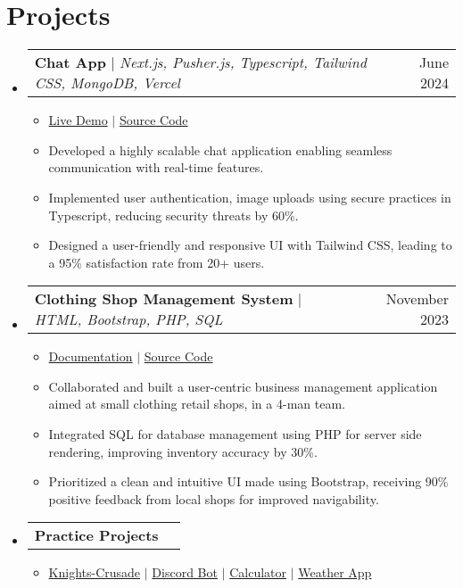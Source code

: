 \documentclass[letterpaper,11pt]{article}
\makeatletter
\newcommand{\resumeItem}[1]{
  \item\small{
    {#1 \vspace{-4pt}}
  }
}
\newcommand{\resumeProjectHeading}[2]{
    \item
    \begin{tabular*}{0.97\textwidth}{l@{\extracolsep{\fill}}r}
      \small#1 & #2 \\
    \end{tabular*}\vspace{-9pt}
}
\newcommand{\resumeSubHeadingListStart}{\begin{itemize}[leftmargin=0.15in, label={}]}
\newcommand{\resumeSubHeadingListEnd}{\end{itemize}}
\newcommand{\resumeItemListStart}{\begin{itemize}[leftmargin=0.15in]}
\newcommand{\resumeItemListEnd}{\end{itemize}\vspace{-6pt}}
\makeatother
\begin{document}
\section{Projects}
   \resumeSubHeadingListStart
     \resumeProjectHeading
         {\textbf{Chat App} $|$ \emph{Next.js, Pusher.js, Typescript, Tailwind CSS, MongoDB, Vercel}}{June 2024}
         \begin{itemize}[leftmargin=0.1in, label={}]
             \item \small{\href{https://chat-app-swart-psi.vercel.app/} {Live Demo} $|$ \href{https://github.com/JaiSwarup/chat-app} {Source Code}}\vspace{-10pt}
         \end{itemize} 
         \resumeItemListStart
           \resumeItem{Developed a highly scalable chat application enabling seamless communication with real-time features.}
           \resumeItem{Implemented user authentication, image uploads using secure practices in Typescript, reducing security threats by 60\%.}
           \resumeItem{Designed a user-friendly and responsive UI with Tailwind CSS, leading to a 95\% satisfaction rate from 20+ users.}
         \resumeItemListEnd
     \resumeProjectHeading
         {\textbf{Clothing Shop Management System} $|$ \emph{HTML, Bootstrap, PHP, SQL}}{November 2023}
         \begin{itemize}[leftmargin=0.1in, label={}]
             \item \small{\href{https://docs.google.com/document/d/1wQDYjDQLSN3Hz9uZrx8XHW-HuwrWJalbk5Lox-Q0Dnc/edit?usp=sharing} {Documentation} $|$ \href{https://github.com/JaiSwarup/crs.github.io} {Source Code}}\vspace{-10pt}
         \end{itemize} 
         \resumeItemListStart
           \resumeItem{Collaborated and built a user-centric business management application aimed at small clothing retail shops, in a 4-man team.}
           \resumeItem{Integrated SQL for database management using PHP for server side rendering, improving inventory accuracy by 30\%.}
           \resumeItem{Prioritized a clean and intuitive UI made using Bootstrap, receiving 90\% positive feedback from local shops for improved navigability.}
         \resumeItemListEnd
     \resumeProjectHeading
         {\textbf{Practice Projects}}{}
         \begin{itemize}[leftmargin=0.1in, label={}]
             \item \small \href{https://github.com/JaiSwarup/knights-crusade} {Knights-Crusade} $|$ \href{https://github.com/JaiSwarup/MemeBot} {Discord Bot} $|$ \href{https://github.com/JaiSwarup/calculatorapp.github.io} {Calculator} $|$ \href{https://github.com/JaiSwarup/weatherapp.github.io} {Weather App}
         \end{itemize}
         \vspace{-10pt}
   \resumeSubHeadingListEnd
\end{document}
